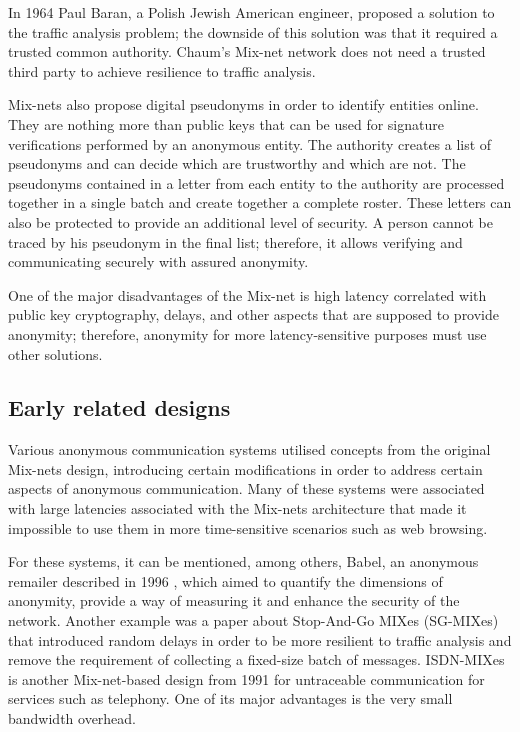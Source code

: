 In 1964 \cite{Baran1964} Paul Baran, a Polish Jewish American engineer, proposed a solution to the traffic analysis problem; the downside of this solution was that it required a trusted common authority. Chaum's Mix-net network does not need a trusted third party to achieve resilience to traffic analysis. 

Mix-nets also propose digital pseudonyms in order to identify entities online. They are nothing more than public keys that can be used for signature verifications performed by an anonymous entity. The authority creates a list of pseudonyms and can decide which are trustworthy and which are not. The pseudonyms contained in a letter from each entity to the authority are processed together in a single batch and create together a complete roster. These letters can also be protected to provide an additional level of security. A person cannot be traced by his pseudonym in the final list; therefore, it allows verifying and communicating securely with assured anonymity. 

One of the major disadvantages of the Mix-net is high latency correlated with public key cryptography, delays, and other aspects that are supposed to provide anonymity; therefore, anonymity for more latency-sensitive purposes must use other solutions.

\subsection{Early related designs}
Various anonymous communication systems utilised concepts from the original Mix-nets design, introducing certain modifications in order to address certain aspects of anonymous communication.
Many of these systems were associated with large latencies associated with the Mix-nets architecture that made it impossible to use them in more time-sensitive scenarios such as web browsing.

For these systems, it can be mentioned, among others, Babel, an anonymous remailer described in 1996 \cite{babel}, which aimed to quantify the dimensions of anonymity, provide a way of measuring it and enhance the security of the network. Another example was a paper about Stop-And-Go MIXes (SG-MIXes) \cite{stop-and-go} that introduced random delays in order to be more resilient to traffic analysis and remove the requirement of collecting a fixed-size batch of messages.
ISDN-MIXes \cite{Pfitzmann91} is another Mix-net-based design from 1991 for untraceable communication for services such as telephony. One of its major advantages is the very small bandwidth overhead.

